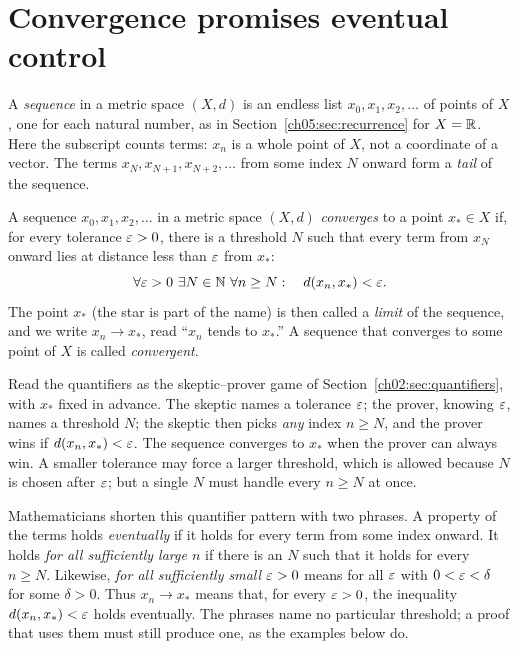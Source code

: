 \section{Convergence promises eventual control}\label{ch11:sec:convergence}
A \emph{sequence} in a metric space $(X,d)$ is an endless list $x_0,x_1,x_2,\ldots$ of points of $X$, one for each natural number, as in Section~\ref{ch05:sec:recurrence} for $X=\mathbb R$. Here the subscript counts terms: $x_n$ is a whole point of $X$, not a coordinate of a vector. The terms $x_N,x_{N+1},x_{N+2},\ldots$ from some index $N$ onward form a \emph{tail} of the sequence.
\par\noindent\begin{minipage}{\linewidth}
\begin{definition}[Convergence]\label{ch11:def:convergence}
A sequence $x_0,x_1,x_2,\ldots$ in a metric space $(X,d)$ \emph{converges} to a point $x_*\in X$ if, for every tolerance $\varepsilon>0$, there is a threshold $N$ such that every term from $x_N$ onward lies at distance less than $\varepsilon$ from $x_*$:
\[
\forall\varepsilon>0\ \exists N\in\mathbb N\ \forall n\ge N:\quad d(x_n,x_*)<\varepsilon.
\]
The point $x_*$ (the star is part of the name) is then called a \emph{limit} of the sequence, and we write $x_n\to x_*$, read ``$x_n$ tends to $x_*$.'' A sequence that converges to some point of $X$ is called \emph{convergent}.
\end{definition}
\end{minipage}\par

Read the quantifiers as the skeptic--prover game of Section~\ref{ch02:sec:quantifiers}, with $x_*$ fixed in advance. The skeptic names a tolerance $\varepsilon$; the prover, knowing $\varepsilon$, names a threshold $N$; the skeptic then picks \emph{any} index $n\ge N$, and the prover wins if $d(x_n,x_*)<\varepsilon$. The sequence converges to $x_*$ when the prover can always win. A smaller tolerance may force a larger threshold, which is allowed because $N$ is chosen after $\varepsilon$; but a single $N$ must handle every $n\ge N$ at once.

Mathematicians shorten this quantifier pattern with two phrases. A property of the terms holds \emph{eventually} if it holds for every term from some index onward. It holds \emph{for all sufficiently large $n$} if there is an $N$ such that it holds for every $n\ge N$. Likewise, \emph{for all sufficiently small $\varepsilon>0$} means for all $\varepsilon$ with $0<\varepsilon<\delta$ for some $\delta>0$. Thus $x_n\to x_*$ means that, for every $\varepsilon>0$, the inequality $d(x_n,x_*)<\varepsilon$ holds eventually. The phrases name no particular threshold; a proof that uses them must still produce one, as the examples below do.

